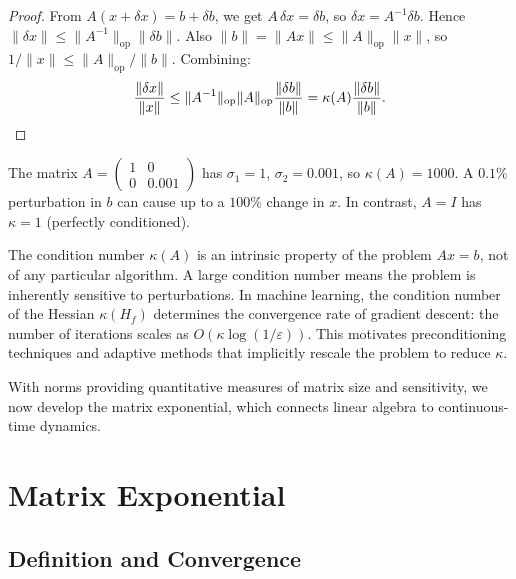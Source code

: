 \documentclass[11pt,a4paper]{article}
\begin{document}
\begin{proof}
From $A(x + \delta x) = b + \delta b$, we get $A\,\delta x = \delta b$,
so $\delta x = A^{-1}\delta b$.  Hence
$\|\delta x\| \leq \|A^{-1}\|_{\mathrm{op}} \|\delta b\|$.
Also $\|b\| = \|Ax\| \leq \|A\|_{\mathrm{op}} \|x\|$, so
$1/\|x\| \leq \|A\|_{\mathrm{op}}/\|b\|$.  Combining:
\[
  \frac{\|\delta x\|}{\|x\|}
  \leq \|A^{-1}\|_{\mathrm{op}} \|A\|_{\mathrm{op}}
       \frac{\|\delta b\|}{\|b\|}
  = \kappa(A) \frac{\|\delta b\|}{\|b\|}. \qedhere
\]
\end{proof}

\begin{example}
\label{ex:condition}
The matrix $A = \begin{pmatrix} 1 & 0 \\ 0 & 0.001 \end{pmatrix}$
has $\sigma_1 = 1$, $\sigma_2 = 0.001$, so $\kappa(A) = 1000$.
A $0.1\%$ perturbation in $b$ can cause up to a $100\%$ change in $x$.
In contrast, $A = I$ has $\kappa = 1$ (perfectly conditioned).
\end{example}

\begin{warning}[title={Condition Number and Numerical Stability}]
The condition number $\kappa(A)$ is an intrinsic property of the
problem $Ax = b$, not of any particular algorithm.  A large condition
number means the problem is inherently sensitive to perturbations.
In machine learning, the condition number of the Hessian
$\kappa(H_f)$ determines the convergence rate of gradient descent:
the number of iterations scales as $O(\kappa \log(1/\varepsilon))$.
This motivates preconditioning techniques and adaptive methods that
implicitly rescale the problem to reduce $\kappa$.
\end{warning}

With norms providing quantitative measures of matrix size and
sensitivity, we now develop the matrix exponential, which connects
linear algebra to continuous-time dynamics.

\section{Matrix Exponential}
\label{sec:matrix_exp}

\subsection{Definition and Convergence}
\end{document}
